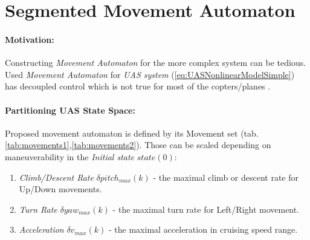 \section{Segmented Movement Automaton}\label{s:segmentedMovementAutomaton}
\paragraph{Motivation:} Constructing \emph{Movement Automaton} for the more complex system can be tedious. Used \emph{Movement Automaton} for \emph{UAS system} (\ref{eq:UASNonlinearModelSimple}) has decoupled control which is not true for most of the copters/planes \cite{fossen2011mathematical}.

\paragraph{Partitioning UAS State Space:} Proposed movement automaton is defined by its Movement set (tab. \ref{tab:movements1},\ref{tab:movements2}). Those can be scaled depending on maneuverability in the  \emph{Initial state} $state(0)$:
\begin{enumerate}
    \item \emph{Climb/Descent Rate} $\delta pitch_{max}(k)$ - the maximal climb or descent rate for Up/Down movements.
    \item \emph{Turn Rate} $\delta yaw_{max}(k)$ - the maximal turn rate for Left/Right movement.
    \item \emph{Acceleration} $\delta v_{max}(k)$ - the maximal acceleration in cruising speed range.
\end{enumerate}

